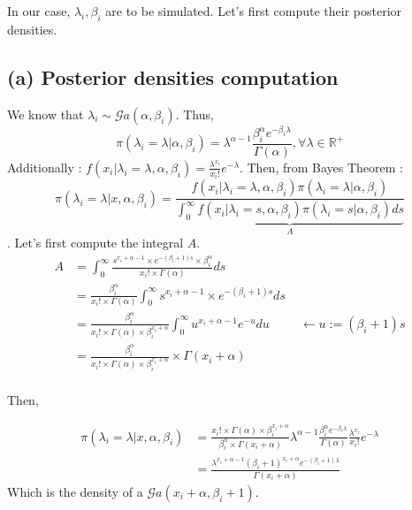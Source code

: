 \documentclass{article}
\begin{document}
In our case, $\lambda_i, \beta_i$ are to be simulated. Let's first compute their posterior densities. 

\subsection*{(a) Posterior densities computation}

We know that $\lambda_i \sim \mathcal{G}a(\alpha, \beta_i) $. Thus, 
$$\pi(\lambda_i = \lambda | \alpha, \beta_i) = \lambda^{\alpha-1}\frac{\beta_i^{\alpha}e^{-\beta_i \lambda}}{\Gamma(\alpha)}, \forall \lambda \in \mathbb{R}^+$$
Additionally : $f(x_i|\lambda_i = \lambda, \alpha, \beta_i) = \frac{\lambda^{x_i}}{x_i!}e^{-\lambda}$. 
Then, from Bayes Theorem :
$$\pi(\lambda_i = \lambda | x , \alpha, \beta_i) = 
\frac{
    f(x_i| \lambda_i = \lambda, \alpha, \beta_i)
     \pi(\lambda_i=\lambda | \alpha, \beta_i)}
{\underset{A}{\underbrace{
    \int_0^{\infty}
    f(x_i|  \lambda_i = s, \alpha, \beta_i)
    \pi(\lambda_i = s| \alpha, \beta_i) 
ds}}}$$.
Let's first compute the integral $A$. 
\begin{align*}
    A &= \int_0^{\infty}
            \frac{
                s^{x_i+\alpha-1} \times e^{-(\beta_i+1)s} \times \beta_i^{\alpha}
            }
            {x_i! \times \Gamma(\alpha)}
            ds \\
      &= \frac{\beta_i^{\alpha}}{ x_i! \times \Gamma(\alpha) }
         \int_0^{\infty}
            s^{x_i+\alpha-1} \times e^{-(\beta_i+1)s}  ds \\
     &= \frac{\beta_i^{\alpha}}{ x_i! \times \Gamma(\alpha) \times \beta_i^{x_i+\alpha}}
        \int_0^{\infty} u^{x_i+\alpha-1} e^{-u} du \ \ \ \ \ \ \ \ \ \ \ \leftarrow u:= (\beta_i+1)s \\
    &=  \frac{\beta_i^{\alpha}}{ x_i! \times \Gamma(\alpha) \times \beta_i^{x_i+\alpha}}
        \times \Gamma(x_i+\alpha) \\
\end{align*}

\noindent Then, 

\begin{align*}
    \pi(\lambda_i = \lambda | x , \alpha, \beta_i) &=
    \frac{ x_i! \times \Gamma(\alpha) \times \beta_i^{x_i+\alpha}}
    {\beta_i^{\alpha}\times \Gamma(x_i+\alpha)}
    \lambda^{\alpha-1}\frac{\beta_i^{\alpha}e^{-\beta_i \lambda}}{\Gamma(\alpha)}
     \frac{\lambda^{x_i}}{x_i!}e^{-\lambda}\\
     &= \frac{\lambda^{x_i+\alpha-1} (\beta_i+1)^{x_i+\alpha} e^{-(\beta_i+1)\lambda}}
     {\Gamma(x_i+\alpha)}
\end{align*}
Which is the density of a $\mathcal{G}a(x_i+\alpha, \beta_i+1)$.
\end{document}
